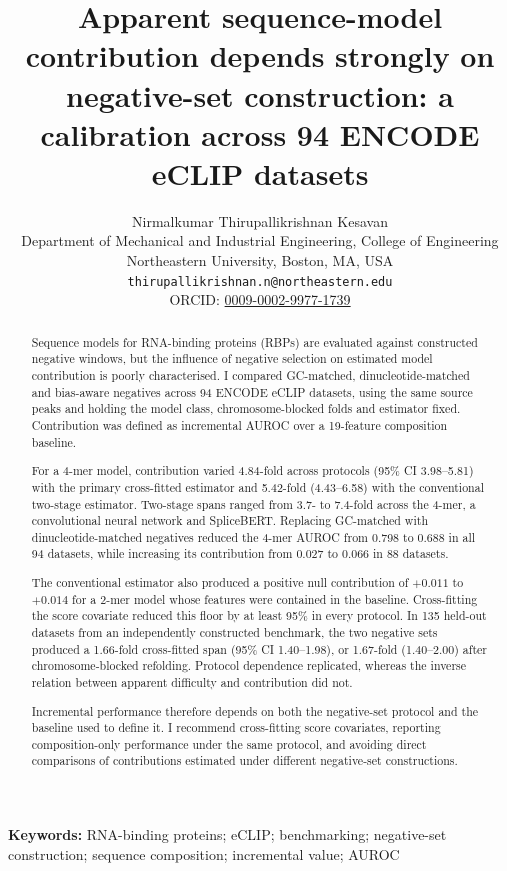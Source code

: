 \documentclass[11pt]{article}
\title{\bfseries Apparent sequence-model contribution depends strongly on negative-set
construction: a calibration across 94 ENCODE eCLIP datasets}
\author{Nirmalkumar Thirupallikrishnan Kesavan\\[2pt]
\normalsize Department of Mechanical and Industrial Engineering, College of Engineering\\
\normalsize Northeastern University, Boston, MA, USA\\
\normalsize \texttt{thirupallikrishnan.n@northeastern.edu}\\[1pt]
\normalsize ORCID: \href{https://orcid.org/0009-0002-9977-1739}{0009-0002-9977-1739}}
\date{}
\begin{document}
\linenumbers
\maketitle

\begin{abstract}
\noindent
Sequence models for RNA-binding proteins (RBPs) are evaluated against constructed negative
windows, but the influence of negative selection on estimated model contribution is poorly
characterised. I compared GC-matched, dinucleotide-matched and bias-aware negatives across 94
ENCODE eCLIP datasets, using the same source peaks and holding the model class,
chromosome-blocked folds and estimator fixed. Contribution was defined as incremental AUROC over a
19-feature composition baseline.

For a 4-mer model, contribution varied 4.84-fold across protocols (95\% CI 3.98--5.81) with the
primary cross-fitted estimator and 5.42-fold (4.43--6.58) with the conventional two-stage
estimator. Two-stage spans ranged from 3.7- to 7.4-fold across the 4-mer, a convolutional neural
network and SpliceBERT. Replacing GC-matched with dinucleotide-matched negatives reduced the
4-mer AUROC from 0.798 to 0.688 in all 94 datasets, while increasing its contribution from
0.027 to 0.066 in 88 datasets.

The conventional estimator also produced a positive null contribution of $+0.011$ to $+0.014$
for a 2-mer model whose features were contained in the baseline. Cross-fitting the score
covariate reduced this floor by at least 95\% in every protocol. In 135 held-out datasets from
an independently constructed benchmark, the two negative sets produced a 1.66-fold
cross-fitted span (95\% CI 1.40--1.98), or 1.67-fold (1.40--2.00) after chromosome-blocked
refolding. Protocol dependence replicated, whereas the inverse relation between apparent
difficulty and contribution did not.

Incremental performance therefore depends on both the negative-set protocol and the baseline
used to define it. I recommend cross-fitting score covariates, reporting composition-only
performance under the same protocol, and avoiding direct comparisons of contributions
estimated under different negative-set constructions.
\end{abstract}

\noindent\textbf{Keywords:} RNA-binding proteins; eCLIP; benchmarking; negative-set
construction; sequence composition; incremental value; AUROC
\end{document}
